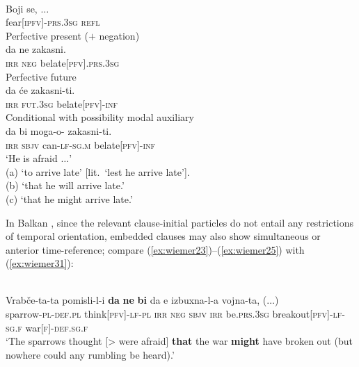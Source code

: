 \documentclass[output=paper,colorlinks,citecolor=brown]{langscibook}
\begin{document}
\ea 
\label{ex:wiemer30}
 \\
\gll Boji se, $\ldots$ \\
fear\textsc{[ipfv]-prs.3sg} \textsc{refl} \\
\ea \label{ex:wiemer30a} \textnormal{Perfective present ($+$ negation)} \\
\gll da ne zakasni. \\
\textsc{irr} \textsc{neg} be\textunderscore late\textsc{[pfv].prs.3sg} \\
\ex \label{ex:wiemer30b} \textnormal{Perfective future} \\
\gll da će zakasni-ti. \\
\textsc{irr} \textsc{fut.3sg} be\textunderscore late\textsc{[pfv]-inf} \\
\ex \label{ex:wiemer30c} \textnormal{Conditional with possibility modal auxiliary} \\
\gll da bi moga-o-\emptyset {} zakasni-ti. \\
\textsc{irr} \textsc{sbjv} can-\textsc{lf-sg.m} be\textunderscore late\textsc{[pfv]-inf} \\
\glt `He is afraid $\ldots$' \\
(a) `to arrive late' [lit.\ `lest he arrive late']. \\
(b) `that he will arrive late.' \\
(c)	`that he might arrive late.'
\z
\z

 In Balkan , since the relevant clause-initial particles do not entail any restrictions of temporal orientation, embedded clauses may also show simultaneous or anterior time-reference; compare (\ref{ex:wiemer23})--(\ref{ex:wiemer25}) with (\ref{ex:wiemer31}):


\ea
\label{ex:wiemer31} 
 \\
\gll Vrabče-ta-ta pomisli-l-i \textbf{da} \textbf{ne} \textbf{bi} da e izbuxna-l-a vojna-ta, \textnormal{($\ldots$)}\\
sparrow-\textsc{pl-def.pl} think\textsc{[pfv]-lf-pl} \textsc{irr} \textsc{neg} \textsc{sbjv} \textsc{irr} be.\textsc{prs.3sg} break\textunderscore out\textsc{[pfv]-lf-sg.f} war\textsc{[f]-def.sg.f} \\
\glt `The sparrows thought [> were afraid] \textbf{that} the war \textbf{might} have broken out (but nowhere could any rumbling be heard).' \\
\z
\end{document}
